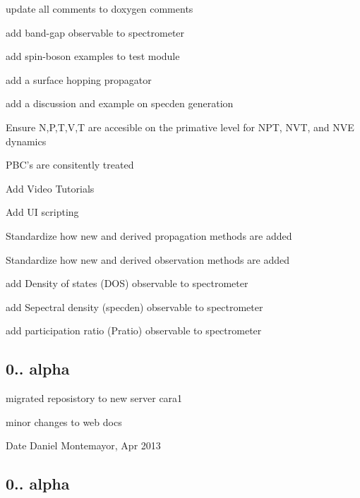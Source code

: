 \begin{DoxyItemize}
\item update all comments to doxygen comments
\item add band-\/gap observable to spectrometer
\item add spin-\/boson examples to test module
\item add a surface hopping propagator
\item add a discussion and example on specden generation
\end{DoxyItemize}


\begin{DoxyItemize}
\item Ensure N,P,T,V,T are accesible on the primative level for N\-P\-T, N\-V\-T, and N\-V\-E dynamics
\item P\-B\-C's are consitently treated
\item Add Video Tutorials
\item Add U\-I scripting
\item Standardize how new and derived propagation methods are added
\item Standardize how new and derived observation methods are added
\item add Density of states (D\-O\-S) observable to spectrometer
\item add Sepectral density (specden) observable to spectrometer
\item add participation ratio (Pratio) observable to spectrometer
\end{DoxyItemize}

   \hypertarget{_tags_v0_1_41a}{}\subsection{0.. alpha}\label{_tags_v0_1_41a}

\begin{DoxyItemize}
\item migrated reposistory to new server cara1
\item minor changes to web docs \begin{DoxyDate}{Date}
Daniel Montemayor, Apr 2013
\end{DoxyDate}

\end{DoxyItemize}\hypertarget{_tags_v0_1_4a}{}\subsection{0.. alpha}\label{_tags_v0_1_4a}

